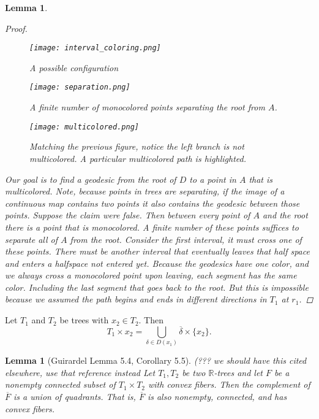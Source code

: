 \documentclass[12pt,parskip=full]{report}
\theoremstyle{plain}
\newtheorem{lem}[thm]{Lemma}
\theoremstyle{definition}
\begin{document}
\begin{lem}
\begin{proof}
\begin{figure}[!h]
    \centering
    \texttt{[image: interval\_coloring.png]}
    \caption{A possible configuration}
    \label{fig:square}
\end{figure}
\begin{figure}[!h]
    \centering
    \texttt{[image: separation.png]}
    \caption{A finite number of monocolored points separating the root from $A$.}
    \label{fig:square}
\end{figure}
\begin{figure}[!h]
    \centering
    \texttt{[image: multicolored.png]}
    \caption{Matching the previous figure, notice the left branch is not multicolored. A particular multicolored path is highlighted.}
    \label{fig:square}
\end{figure}


        Our goal is to find a geodesic from the root of \(D\) to a point in \(A\) that is multicolored. Note, because points in trees are separating, if the image of a continuous map contains two points it also contains the geodesic between those points. Suppose the claim were false. Then between every point of \(A\) and the root there is a point that is monocolored. A finite number of these points suffices to separate all of \(A\) from the root. Consider the first interval, it must cross one of these points. There must be another interval that eventually leaves that half space and enters a halfspace not entered yet. Because the geodesics have one color, and we always cross a monocolored point upon leaving, each segment has the same color. Including the last segment that goes back to the root. But this is impossible because we assumed the path begins and ends in different directions in \(T_{1}\) at \(r_{1}\).

    \end{proof}
\end{lem}

\begin{pro}
\label{prop:directionunion}
Let $T_1$ and $T_2$ be trees with $x_2\in T_2$. Then $$T_1\times x_2 = \bigcup_{\delta \in D(x_1)} \overline{\delta}\times \{x_2\}.$$
\end{pro}

\begin{lem}
	[Guirardel Lemma 5.4, Corollary 5.5]
	(??? we should have this cited elsewhere, use that reference instead
 \label{lem:guirardel} 
	Let \(T_{1} , T_{2}\) be two \(\mathbb{R}\)-trees and let \(F\) be a nonempty connected subset of \(T_{1} \times T_{2}\) with convex fibers. Then the complement of \(\overline{F}\) is a union of quadrants. That is, \(\overline{F}\) is also nonempty, connected, and has convex fibers.
\end{lem}
\end{document}
